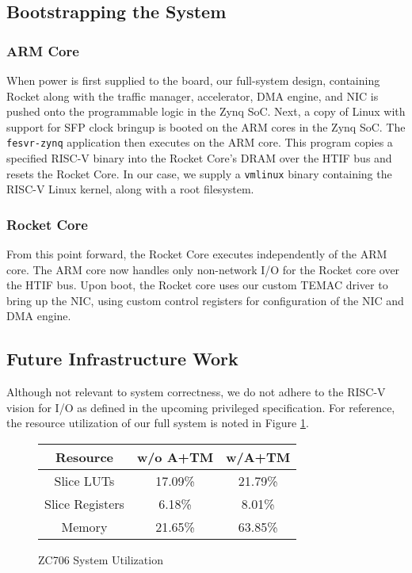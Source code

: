 \subsection{Bootstrapping the System}
    \subsubsection{ARM Core}

    When power is first supplied to the board, our full-system design, containing
    Rocket along with the traffic manager, accelerator, DMA engine, and NIC is 
    pushed onto the programmable logic in the Zynq SoC. Next, a copy of Linux
    with support for SFP clock bringup is booted on the ARM cores in the Zynq
    SoC. The \texttt{fesvr-zynq} application then executes on the ARM core. 
    This program copies a specified RISC-V binary into the Rocket Core's DRAM 
    over the HTIF bus and resets the Rocket Core. In our case, we supply a 
    \texttt{vmlinux} binary containing the RISC-V Linux kernel, along with a 
    root filesystem.

    \subsubsection{Rocket Core}

    From this point forward, the Rocket Core executes independently of the ARM 
    core. The ARM core now handles only non-network I/O for the Rocket core over
    the HTIF bus. Upon boot, the Rocket core uses our custom TEMAC driver to 
    bring up the NIC, using custom control registers for configuration of the
    NIC and DMA engine.


\subsection{Future Infrastructure Work}
    Although not relevant to system correctness, we do not adhere to the RISC-V
    vision for I/O as defined in the upcoming privileged 
    specification. For reference, the resource utilization of our full system 
    is noted in Figure \ref{fig:utiltab}.
    

\begin{figure}[t]
\begin{center}
\label{fig:utiltab}
\begin{tabular}{ | c | c | c |  } \hline
    Resource        & w/o A+TM & w/A+TM  \\ \hline
    Slice LUTs      & 17.09\%   &  21.79\%   \\  \hline
    Slice Registers & 6.18\%    &  8.01\%    \\  \hline
    Memory          & 21.65\%   &  63.85\%   \\  \hline
\end{tabular}
\caption{ZC706 System Utilization}
\end{center}
\end{figure}



